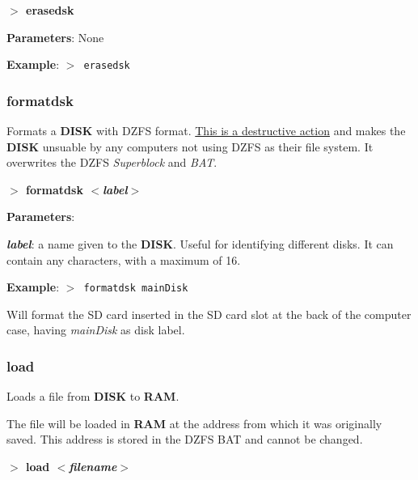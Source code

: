         \hspace{1.9cm}\textbf{$>$ erasedsk}

        \textbf{Parameters}: None

        \textbf{Example}: \texttt{$>$ erasedsk}

        \subsubsection{{formatdsk}}
        Formats a \textbf{DISK} with DZFS format. \underline{This is a
        destructive action} and makes the \textbf{DISK} unsuable by any
        computers not using DZFS as their file system. It overwrites the DZFS
        \textit{Superblock} and \textit{BAT}.

        \hspace{1.9cm}\textbf{$>$ formatdsk \textit{$<$label$>$}}

        \textbf{Parameters}:

        \hspace{1cm}\textbf{\textit{label}}: a name given to the \textbf{DISK}.
        Useful for identifying different disks. It can contain any characters,
        with a maximum of 16.

        \textbf{Example}: \texttt{$>$ formatdsk mainDisk}

        Will format the SD card inserted in the SD card slot at the back of the
        computer case, having \textit{mainDisk} as disk label.

        \subsubsection{{load}}
        \label{cmd:load}

        Loads a file from \textbf{DISK} to \textbf{RAM}.
        
        The file will be loaded in \textbf{RAM} at the address from which it was
        originally saved. This address is stored in the DZFS BAT and cannot be
        changed. 

        \hspace{1.9cm}\textbf{$>$ load \textit{$<$filename$>$}}

